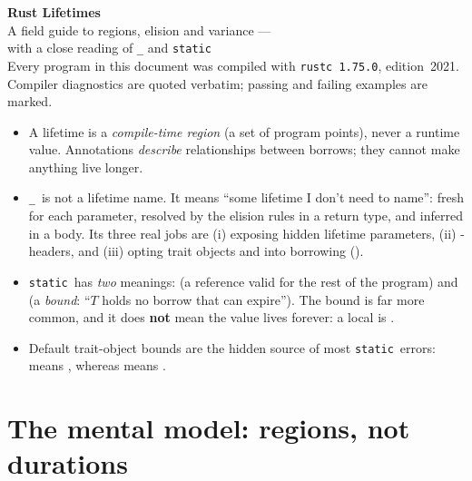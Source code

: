 \documentclass[10.5pt,a4paper]{article}
\newcommand{\st}{\texorpdfstring{\texttt{\textquotesingle static}}{'static}}
\newcommand{\us}{\texorpdfstring{\texttt{\textquotesingle\_}}{'\_}}
\let\origsection\section
\renewcommand{\section}{\needspace{9\baselineskip}\origsection}
\begin{document}
\thispagestyle{plain}

\begin{tcolorbox}[enhanced,colback=accent,colframe=accent,coltext=white,arc=3pt,
  left=14pt,right=14pt,top=12pt,bottom=12pt]
{\sffamily\bfseries\fontsize{26}{30}\selectfont Rust Lifetimes}\\[4pt]
{\sffamily\large A field guide to regions, elision and variance ---\\
with a close reading of \texttt{\textquotesingle\_} and \texttt{\textquotesingle static}}\\[8pt]
{\sffamily\small Every program in this document was compiled with \texttt{rustc 1.75.0}, edition~2021.
Compiler diagnostics are quoted verbatim; passing and failing examples are marked.}
\end{tcolorbox}

\begin{keyidea}
\begin{itemize}
\item A lifetime is a \emph{compile-time region} (a set of program points), never a runtime value. Annotations
  \emph{describe} relationships between borrows; they cannot make anything live longer.
\item \us\ is not a lifetime name. It means ``some lifetime I don't need to name'': fresh for each parameter,
  resolved by the elision rules in a return type, and inferred in a body. Its three real jobs are (i) exposing
  hidden lifetime parameters, (ii) -headers, and (iii) opting trait objects and  into
  borrowing ().
\item \st\ has \emph{two} meanings:  (a reference valid for the rest of the program) and
   (a \emph{bound}: ``$T$ holds no borrow that can expire''). The bound is far more common,
  and it does \textbf{not} mean the value lives forever: a local  is .
\item Default trait-object bounds are the hidden source of most \st\ errors:  means
  , whereas  means .
\end{itemize}
\end{keyidea}

\setcounter{tocdepth}{1}
\tableofcontents

\section{The mental model: regions, not durations}
\end{document}

